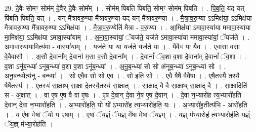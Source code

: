 \documentclass[17pt]{extarticle}
\begin{document}
29. दे॒वैः सोमꣳ॒॒ सोम॑म् दे॒वैर् दे॒वैः सोम᳚म् । . सोम॑म् पिबति पिबति॒ सोमꣳ॒॒ सोम॑म् पिबति । . पि॒ब॒ति॒ यद् यत् पि॑बति पिबति॒ यत् । . यन् मै᳚त्रावरु॒ण्या मै᳚त्रावरु॒ण्या यद् यन् मै᳚त्रावरु॒ण्या । . मै॒त्रा॒व॒रु॒ण्या ऽऽमिक्ष॑या॒ ऽऽमिक्ष॑या मैत्रावरु॒ण्या मै᳚त्रावरु॒ण्या ऽऽमिक्ष॑या । . मै॒त्रा॒व॒रु॒ण्येति॑ मैत्रा - व॒रु॒ण्या । . आ॒मिक्ष॑या ऽमावा॒स्या॑या ममावा॒स्या॑या मा॒मिक्ष॑या॒ ऽऽमिक्ष॑या ऽमावा॒स्या॑याम् । . अ॒मा॒वा॒स्या॑यां॒ ॅयज॑ते॒ यज॑ते ऽमावा॒स्या॑या ममावा॒स्या॑यां॒ ॅयज॑ते । . अ॒मा॒वा॒स्या॑या॒मित्य॑मा - वा॒स्या॑याम् । . यज॑ते॒ या या यज॑ते॒ यज॑ते॒ या । . यैवैव या यैव । . ए॒वासा व॒सा वे॒वैवासौ । . अ॒सौ दे॒वाना᳚म् दे॒वाना॑ म॒सा व॒सौ दे॒वाना᳚म् । . दे॒वानां᳚ ॅव॒शा व॒शा दे॒वाना᳚म् दे॒वानां᳚ ॅव॒शा । . व॒शा ऽनू॑ब॒न्ध्या॑ ऽनूब॒न्ध्या॑ व॒शा व॒शा ऽनू॑ब॒न्ध्या᳚ । . अ॒नू॒ब॒न्ध्या॑ सो सो अ॑नूब॒न्ध्या॑ ऽनूब॒न्ध्या॑ सो । . अ॒नू॒ब॒न्ध्येत्य॑नु - ब॒न्ध्या᳚ । . सो ए॒वैव सो सो ए॒व । . सो इति॒ सो । . ए॒वै षैषै वैवैषा । . ए॒षैतस्यै॒ तस्यै॒ षैषैतस्य॑ । . ए॒तस्य॑ सा॒क्षाथ् सा॒क्षा दे॒तस्यै॒तस्य॑ सा॒क्षात् । . सा॒क्षाद् वै वै सा॒क्षाथ् सा॒क्षाद् वै । . सा॒क्षादिति॑ स - अ॒क्षात् । . वा ए॒ष ए॒ष वै वा ए॒षः । . ए॒ष दे॒वान् दे॒वा ने॒ष ए॒ष दे॒वान् । . दे॒वा न॒भ्यारो॑ह त्य॒भ्यारो॑हति दे॒वान् दे॒वा न॒भ्यारो॑हति । . अ॒भ्यारो॑हति॒ यो यो᳚ ऽभ्यारो॑ह त्य॒भ्यारो॑हति॒ यः । . अ॒भ्यारो॑ह॒तीत्य॑भि - आरो॑हति । . य ए॑षा मेषां॒ ॅयो य ए॑षाम् । . ए॒षां॒ ॅय॒ज्ञ्ं ॅय॒ज्ञ् मे॑षा मेषां ॅय॒ज्ञ्म् । . य॒ज्ञ् म॑भ्या॒रोह॑ त्यभ्या॒रोह॑ति य॒ज्ञ्ं ॅय॒ज्ञ् म॑भ्या॒रोह॑ति । \newline
\end{document}
